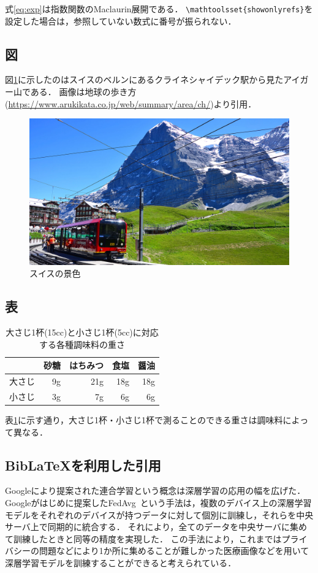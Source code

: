 \documentclass[
    luatex,
    unicode,
    titlepage,
    pdfusetitle
]{ltjsarticle}
\begin{document}
式\eqref{eq:exp}は指数関数のMaclaurin展開である．
\verb|\mathtoolsset{showonlyrefs}|を設定した場合は，参照していない数式に番号が振られない．


\subsection{図}
図\ref{fig:switzerland}に示したのはスイスのベルンにあるクライネシャイデック駅から見たアイガー山である．
画像は地球の歩き方 (\url{https://www.arukikata.co.jp/web/summary/area/ch/})より引用．


\begin{figure}[H]
  \centering
  \includegraphics*[width=12cm]{src/img/switzerland.jpg}
  \caption{スイスの景色}
  \label{fig:switzerland}
\end{figure}



\subsection{表}

\begin{table}[H]
	\caption{大さじ1杯(15cc)と小さじ1杯(5cc)に対応する各種調味料の重さ}
	\label{tab:weight}
	\centering
	\begin{tabular}{lrrrr}
		\hline
		       & 砂糖 & はちみつ & 食塩 & 醤油 \\ \hline\hline
		大さじ & 9g   & 21g      & 18g  & 18g  \\
		小さじ & 3g   & 7g       & 6g   & 6g   \\ \hline
	\end{tabular}
\end{table}

表\ref{tab:weight}に示す通り，大さじ1杯・小さじ1杯で測ることのできる重さは調味料によって異なる．


\subsection{Bib\LaTeX を利用した引用}
Googleにより提案された連合学習という概念は深層学習の応用の幅を広げた．
Googleがはじめに提案したFedAvg~\cite{McMahan2017-pc}という手法は，複数のデバイス上の深層学習モデルをそれぞれのデバイスが持つデータに対して個別に訓練し，それらを中央サーバ上で同期的に統合する．
それにより，全てのデータを中央サーバに集めて訓練したときと同等の精度を実現した．
この手法により，これまではプライバシーの問題などにより1か所に集めることが難しかった医療画像などを用いて深層学習モデルを訓練することができると考えられている．

\printbibliography[title=参考文献]
\end{document}
